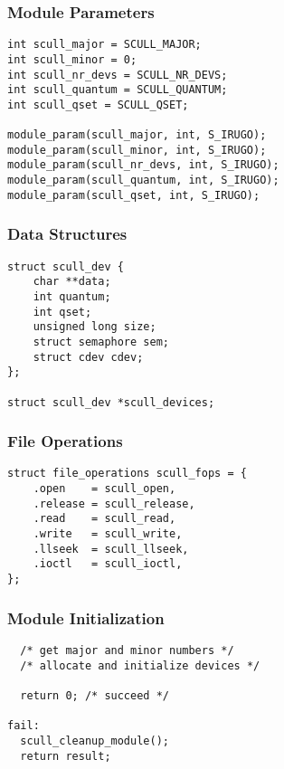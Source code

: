 \documentclass[dvipsnames]{beamer}
\begin{document}
\begin{frame}[fragile]
  \frametitle{Module Parameters}

  \begin{exampleblock}{}
    \begin{lstlisting}
int scull_major = SCULL_MAJOR;
int scull_minor = 0;
int scull_nr_devs = SCULL_NR_DEVS;
int scull_quantum = SCULL_QUANTUM;
int scull_qset = SCULL_QSET;

module_param(scull_major, int, S_IRUGO);
module_param(scull_minor, int, S_IRUGO);
module_param(scull_nr_devs, int, S_IRUGO);
module_param(scull_quantum, int, S_IRUGO);
module_param(scull_qset, int, S_IRUGO);
    \end{lstlisting}
  \end{exampleblock}
\end{frame}

\begin{frame}[fragile]
  \frametitle{Data Structures}

  \begin{exampleblock}{}
    \begin{lstlisting}
struct scull_dev {
    char **data;
    int quantum;
    int qset;
    unsigned long size;
    struct semaphore sem;
    struct cdev cdev;
};

struct scull_dev *scull_devices;
    \end{lstlisting}
  \end{exampleblock}
\end{frame}

\begin{frame}[fragile]
  \frametitle{File Operations}

  \begin{exampleblock}{}
    \begin{lstlisting}
struct file_operations scull_fops = {
    .open    = scull_open,
    .release = scull_release,
    .read    = scull_read,
    .write   = scull_write,
    .llseek  = scull_llseek,
    .ioctl   = scull_ioctl,
};
    \end{lstlisting}
  \end{exampleblock}
\end{frame}

\begin{frame}[fragile]
  \frametitle{Module Initialization}

  \begin{exampleblock}{}
    \begin{lstlisting}
  /* get major and minor numbers */
  /* allocate and initialize devices */

  return 0; /* succeed */

fail:
  scull_cleanup_module();
  return result;
    \end{lstlisting}
  \end{exampleblock}
\end{frame}
\end{document}
